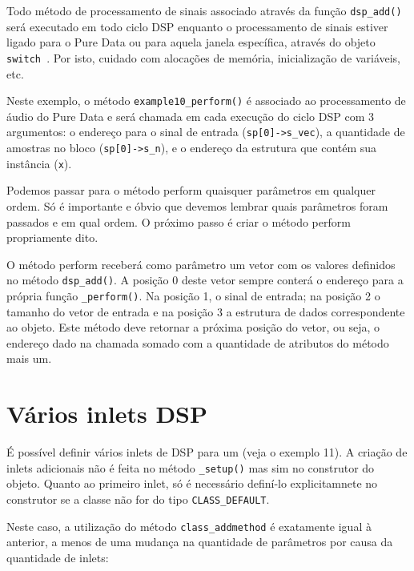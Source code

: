 Todo método de processamento de sinais associado através da função
\texttt{dsp\_add()} será executado em todo ciclo DSP enquanto o processamento
de sinais estiver ligado para o Pure Data ou para aquela janela específica,
através do objeto \texttt{switch~}. Por isto, cuidado com alocações de
memória, inicialização de variáveis, etc.

Neste exemplo, o método \texttt{example10\_perform()} é associado ao
processamento de áudio do Pure Data e será chamada em cada execução do ciclo
DSP com 3 argumentos: o endereço para o sinal de entrada
(\texttt{sp[0]->s\_vec}), a quantidade de amostras no bloco
(\texttt{sp[0]->s\_n}), e o endereço da estrutura que contém sua instância
(\texttt{x}).

Podemos passar para o método perform quaisquer parâmetros em qualquer ordem.
Só é importante e óbvio que devemos lembrar quais parâmetros foram passados e
em qual ordem. O próximo passo é criar o método perform propriamente dito.




O método perform receberá como parâmetro um vetor com os valores definidos no
método \texttt{dsp\_add()}. A posição 0 deste vetor sempre conterá o endereço
para a própria função \texttt{\_perform()}. Na posição 1, o sinal de entrada;
na posição 2 o tamanho do vetor de entrada e na posição 3 a estrutura de dados
correspondente ao objeto. Este método deve retornar a próxima posição do
vetor, ou seja, o endereço dado na chamada somado com a quantidade de
atributos do método mais um.

\section{Vários inlets DSP}

É possível definir vários inlets de DSP para um \external (veja o exemplo 11).
A criação de inlets adicionais não é feita no método \texttt{\_setup()} mas
sim no construtor do objeto. Quanto ao primeiro inlet, só é necessário
definí-lo explicitamnete no construtor se a classe não for do tipo
\texttt{CLASS\_DEFAULT}.



Neste caso, a utilização do método \texttt{class\_addmethod} é exatamente
igual à anterior, a menos de uma mudança na quantidade de parâmetros por causa
da quantidade de inlets:

